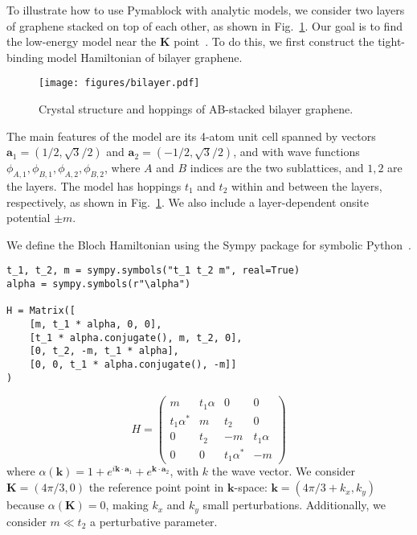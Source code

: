 To illustrate how to use Pymablock with analytic models, we consider two layers of graphene stacked on top of each other, as shown in Fig.~\ref{fig:bilayer}.
Our goal is to find the low-energy model near the $\mathbf{K}$ point~\cite{McCann_2013}.
To do this, we first construct the tight-binding model Hamiltonian of bilayer graphene.
%
\begin{figure}[!htbp]
\centering
\texttt{[image: figures/bilayer.pdf]}
\caption[]{Crystal structure and hoppings of AB-stacked bilayer graphene.}
\label{fig:bilayer}
\end{figure}
%
The main features of the model are its 4-atom unit cell spanned by vectors $\mathbf{a}_1 = (1/2, \sqrt{3}/2)$ and $\mathbf{a}_2=( -1/2, \sqrt{3}/2)$, and with wave functions $\phi_{A,1}, \phi_{B,1}, \phi_{A,2}, \phi_{B,2}$, where $A$ and $B$ indices are the two sublattices, and $1,2$ are the layers.
The model has hoppings $t_1$ and $t_2$ within and between the layers, respectively, as shown in Fig.~\ref{fig:bilayer}.
We also include a layer-dependent onsite potential $\pm m$.

We define the Bloch Hamiltonian using the Sympy package for symbolic Python~\cite{Meurer_2017}.
%
\begin{verbatim}
t_1, t_2, m = sympy.symbols("t_1 t_2 m", real=True)
alpha = sympy.symbols(r"\alpha")

H = Matrix([
    [m, t_1 * alpha, 0, 0],
    [t_1 * alpha.conjugate(), m, t_2, 0],
    [0, t_2, -m, t_1 * alpha],
    [0, 0, t_1 * alpha.conjugate(), -m]]
)
\end{verbatim}
%
$$
H =
\begin{pmatrix}
m & t_1 \alpha & 0 & 0\\
t_1 \alpha^{*} & m & t_2 & 0\\
0 & t_2 & -m & t_1 \alpha\\
0 & 0 & t_1 \alpha^{*} & -m
\end{pmatrix}
$$
%
where $\alpha(\mathbf{k}) = 1 + e^{i \mathbf{k} \cdot \mathbf{a}_1} + e^{\mathbf{k} \cdot \mathbf{a}_2}$, with $k$ the wave vector.
We consider $\mathbf{K}=(4\pi/3, 0)$ the reference point point in $\mathbf{k}$-space: $\mathbf{k} = (4\pi/3 + k_x, k_y)$ because $\alpha(\mathbf{K}) = 0$, making $k_x$ and $k_y$ small perturbations.
Additionally, we consider $m \ll t_2$ a perturbative parameter.

